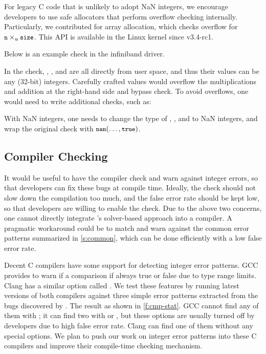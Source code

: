 For legacy C code that is unlikely to adopt NaN integers, we encourage
developers to use safe allocators that perform overflow checking
internally.  Particularly, we contributed  for array allocation, which checks overflow for $\cc{n}
\times_u \cc{size}$. This API is available in the Linux kernel
since v3.4-rc1.

Below is an example check in the infiniband driver.

In the check, , , and  are
all directly from user space, and thus their values can be any
(32-bit) integers.  Carefully crafted values would overflow the
multiplications and addition at the right-hand side and bypass
check.  To avoid overflows, one would need to write additional
checks, such as:

With NaN integers, one needs to change the type of
, , and  to NaN integers,
and wrap the original check with $\cc{nan}(\dots, \cc{true})$.

\fi


\subsection{Compiler Checking}

It would be useful to have the compiler check and warn against
integer errors, so that developers can fix these bugs
at compile time.  Ideally, the check should not slow down
the compilation too much, and the false error rate should be kept low,
so that developers are willing to enable the check.
%
Due to the above two concerns, one cannot directly integrate
\sys's solver-based approach into a compiler.  A pragmatic workaround
could be to match and warn against the common error patterns
summarized in \autoref{s:common}, which can be done efficiently
with a low false error rate.

Decent C compilers have some support for detecting integer error
patterns.
%
GCC provides  to warn if a comparison if always
true or false due to type range limits.
%
Clang has a similar option called .
%
We test these features by running latest versions of both compilers
against three simple error patterns extracted from the bugs discovered
by \sys.  The result as shown in \autoref{f:cmp-stat}.  GCC cannot
find any of them with ; it can find two with 
or , but these options are usually turned off by
developers due to high false error rate.  Clang can find one of them
without any special options.
%
%
We plan to push our work on integer error patterns into these C
compilers and improve their compile-time checking mechanism.

